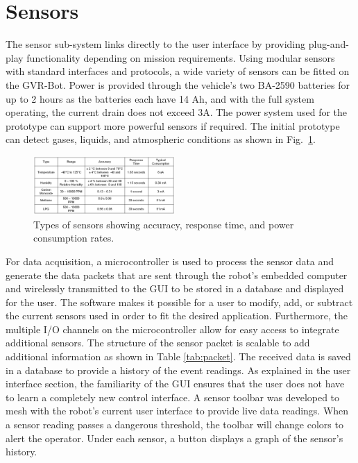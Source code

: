 \section{Sensors}\label{sec:sensors}

The sensor sub-system links directly to the user interface by providing plug-and-play functionality depending on mission requirements. Using modular sensors with standard interfaces and protocols, a wide variety of sensors can be fitted on the GVR-Bot. Power is provided through the vehicle's two BA-2590 batteries for up to 2 hours as the batteries each have 14 Ah, and with the full system operating, the current drain does not exceed 3A. The power system used for the prototype can support more powerful sensors if required. The initial prototype can detect gases, liquids, and atmospheric conditions as shown in Fig.~\ref{fig:params}.

\begin{figure}
	\centering
	\includegraphics[width=0.48\textwidth]{./pictures/sensor_params.png}
	\caption{Types of sensors showing accuracy, response time, and power consumption rates.}
	\label{fig:params}
\end{figure}

For data acquisition, a microcontroller is used to process the sensor data and generate the data packets that are sent through the robot's embedded computer and wirelessly transmitted to the GUI to be stored in a database and displayed for the user. The software makes it possible for a user to modify, add, or subtract the current sensors used in order to fit the desired application. Furthermore, the multiple I/O channels on the microcontroller allow for easy access to integrate additional sensors. The structure of the sensor packet is scalable to add additional information as shown in Table \ref{tab:packet}. The received data is saved in a database to provide a history of the event readings. As explained in the user interface section, the familiarity of the GUI ensures that the user does not have to learn a completely new control interface. A sensor toolbar was developed to mesh with the robot's current user interface to provide live data readings. When a sensor reading passes a dangerous threshold, the toolbar will change colors to alert the operator. Under each sensor, a button displays a graph of the sensor's history.

